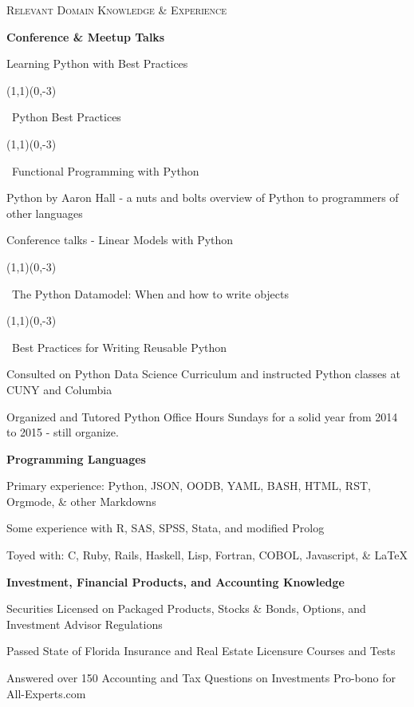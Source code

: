 \documentclass[letterpaper,10pt]{article}
\date{08/22/11}
\newcommand{\sbullet}{\,\begin{picture}(1,1)(0,-3)\circle*{3}\end{picture}\ }
\begin{document}
\textsc{Relevant Domain Knowledge \& Experience}
\vspace{.5mm}
  \hline
{\addtolength{\leftskip}{0mm} \textbf{Conference \& Meetup Talks}

\vspace{-2mm} {\addtolength{\leftskip}{0mm}
\begin{itemize}\setlength{\itemsep}{0cm}\setlength{\parskip}{0cm} {\addtolength{\leftskip}{-5mm}
  \item Learning Python with Best Practices \sbullet Python Best Practices \sbullet Functional Programming with Python
  \item Python by Aaron Hall - a nuts and bolts overview of Python to programmers of other languages
  \item Conference talks - Linear Models with Python \sbullet The Python Datamodel: When and how to write objects 
        \sbullet Best Practices for Writing Reusable Python
  \item Consulted on Python Data Science Curriculum and instructed Python classes at CUNY and Columbia
  \item Organized and Tutored Python Office Hours Sundays for a solid year from 2014 to 2015 - still organize.

}
\end{itemize}

}}

\vspace{-1mm}
{\addtolength{\leftskip}{0mm} \textbf{Programming Languages}

\vspace{-2mm} {\addtolength{\leftskip}{0mm}
\begin{itemize}\setlength{\itemsep}{0cm}\setlength{\parskip}{0cm} {\addtolength{\leftskip}{-5mm}
  \item Primary experience: Python, JSON, OODB, YAML, BASH, HTML, RST, Orgmode, \& other Markdowns
  \item Some experience with R, SAS, SPSS, Stata, and modified Prolog
  \item Toyed with: C, Ruby, Rails, Haskell, Lisp, Fortran, COBOL, Javascript, \& \LaTeX  

}
\end{itemize}

}}

\vspace{-1mm}
{\addtolength{\leftskip}{0mm} \textbf{Investment, Financial Products, and Accounting Knowledge}

\vspace{-2mm} {\addtolength{\leftskip}{0mm}
\begin{itemize}\setlength{\itemsep}{0cm}\setlength{\parskip}{0cm} {\addtolength{\leftskip}{-5mm}
  \item Securities Licensed on Packaged Products, Stocks & Bonds, Options, and Investment Advisor Regulations
  \item Passed State of Florida Insurance and Real Estate Licensure Courses and Tests
  \item Answered over 150 Accounting and Tax Questions on Investments Pro-bono for All-Experts.com

}
\end{itemize}

}}
\end{document}
